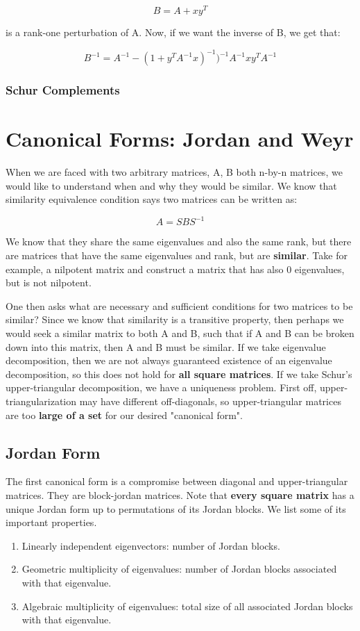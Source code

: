 \documentclass[class=article, crop=false]{standalone}
\begin{document}
			$$B = A + xy^T$$

		is a rank-one perturbation of A. Now, if we want the inverse of B, we get that:

			$$B^{-1} = A^{-1} - (1 + y^T A^{-1} x)^{-1})^{-1}A^{-1} x y^T A^{-1}$$

	\subsubsection{Schur Complements}
\section{Canonical Forms: Jordan and Weyr}
	When we are faced with two arbitrary matrices, A, B both n-by-n matrices, we would like to understand when and why they would be similar. We know that similarity equivalence condition says two matrices can be written as:

		$$A = SBS^{-1}$$

	We know that they share the same eigenvalues and also the same rank, but there are matrices that have the same eigenvalues and rank, but are \textbf{similar}. Take for example, a nilpotent matrix and construct a matrix that has also 0 eigenvalues, but is not nilpotent.

	One then asks what are necessary and sufficient conditions for two matrices to be similar? Since we know that similarity is a transitive property, then perhaps we would seek a similar matrix to both A and B, such that if A and B can be broken down into this matrix, then A and B must be similar. If we take eigenvalue decomposition, then we are not always guaranteed existence of an eigenvalue decomposition, so this does not hold for \textbf{all square matrices}. If we take Schur's upper-triangular decomposition, we have a uniqueness problem. First off, upper-triangularization may have different off-diagonals, so upper-triangular matrices are too \textbf{large of a set} for our desired "canonical form".

	\subsection{Jordan Form}
		The first canonical form is a compromise between diagonal and upper-triangular matrices. They are block-jordan matrices. Note that \textbf{every square matrix} has a unique Jordan form up to permutations of its Jordan blocks. We list some of its important properties.

		\begin{enumerate}
			\item Linearly independent eigenvectors: number of Jordan blocks.
			\item Geometric multiplicity of eigenvalues: number of Jordan blocks associated with that eigenvalue.
			\item Algebraic multiplicity of eigenvalues: total size of all associated Jordan blocks with that eigenvalue.
		\end{enumerate}
\end{document}
